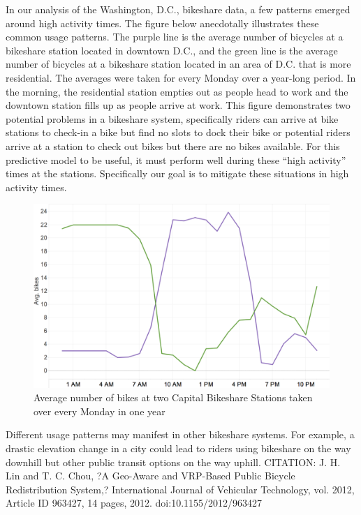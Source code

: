 \documentclass{acm_proc_article-sp}
\begin{document}
In our analysis of the Washington, D.C., bikeshare data, a few patterns emerged around high activity times. The figure below anecdotally illustrates these common usage patterns. The purple line is the average number of bicycles at a bikeshare station located in downtown D.C., and the green line is the average number of bicycles at a bikeshare station located in an area of D.C. that is more residential. The averages were taken for every Monday over a year-long period. In the morning, the residential station empties out as people head to work and the downtown station fills up as people arrive at work. This figure demonstrates two potential problems in a bikeshare system, specifically riders can arrive at bike stations to check-in a bike but find no slots to dock their bike or potential riders arrive at a station to check out bikes but there are no bikes available.  For this predictive model to be useful, it must perform well during these ``high activity'' times at the stations. Specifically our goal is to mitigate these situations in high activity times.

\begin{figure} [!h]
\caption{Average number of bikes at two Capital Bikeshare Stations taken over every Monday in one year}
\centering
\includegraphics[scale = 0.35]{stations_over_time.png}
\end{figure}

Different usage patterns may manifest in other bikeshare systems. For example, a drastic elevation change in a city could lead to riders using bikeshare on the way downhill but other public transit options on the way uphill. CITATION: J. H. Lin and T. C. Chou, ?A Geo-Aware and VRP-Based Public Bicycle Redistribution System,? International Journal of Vehicular Technology, vol. 2012, Article ID 963427, 14 pages, 2012. doi:10.1155/2012/963427
\end{document}
